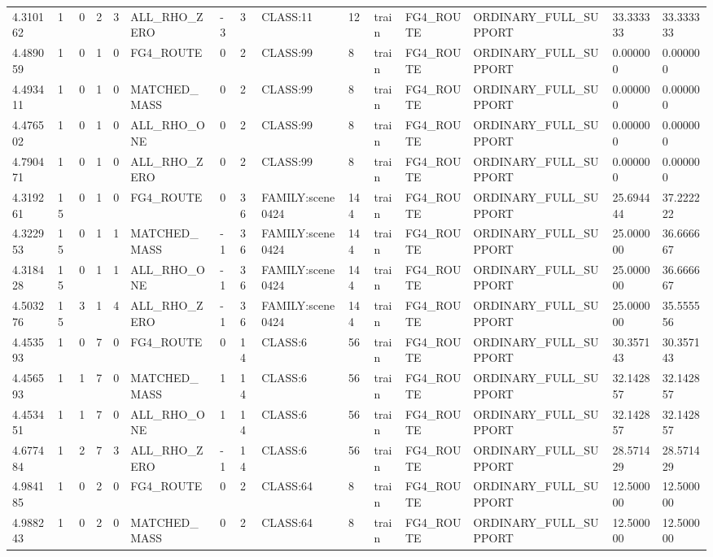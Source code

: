 \begin{tabular}{lllllllllllllll}
4.310162 & 1 & 0 & 2 & 3 & ALL\_RHO\_ZERO & -3 & 3 & CLASS:11 & 12 & train & FG4\_ROUTE & ORDINARY\_FULL\_SUPPORT & 33.333333 & 33.333333 \\
4.489059 & 1 & 0 & 1 & 0 & FG4\_ROUTE & 0 & 2 & CLASS:99 & 8 & train & FG4\_ROUTE & ORDINARY\_FULL\_SUPPORT & 0.000000 & 0.000000 \\
4.493411 & 1 & 0 & 1 & 0 & MATCHED\_MASS & 0 & 2 & CLASS:99 & 8 & train & FG4\_ROUTE & ORDINARY\_FULL\_SUPPORT & 0.000000 & 0.000000 \\
4.476502 & 1 & 0 & 1 & 0 & ALL\_RHO\_ONE & 0 & 2 & CLASS:99 & 8 & train & FG4\_ROUTE & ORDINARY\_FULL\_SUPPORT & 0.000000 & 0.000000 \\
4.790471 & 1 & 0 & 1 & 0 & ALL\_RHO\_ZERO & 0 & 2 & CLASS:99 & 8 & train & FG4\_ROUTE & ORDINARY\_FULL\_SUPPORT & 0.000000 & 0.000000 \\
4.319261 & 15 & 0 & 1 & 0 & FG4\_ROUTE & 0 & 36 & FAMILY:scene0424 & 144 & train & FG4\_ROUTE & ORDINARY\_FULL\_SUPPORT & 25.694444 & 37.222222 \\
4.322953 & 15 & 0 & 1 & 1 & MATCHED\_MASS & -1 & 36 & FAMILY:scene0424 & 144 & train & FG4\_ROUTE & ORDINARY\_FULL\_SUPPORT & 25.000000 & 36.666667 \\
4.318428 & 15 & 0 & 1 & 1 & ALL\_RHO\_ONE & -1 & 36 & FAMILY:scene0424 & 144 & train & FG4\_ROUTE & ORDINARY\_FULL\_SUPPORT & 25.000000 & 36.666667 \\
4.503276 & 15 & 3 & 1 & 4 & ALL\_RHO\_ZERO & -1 & 36 & FAMILY:scene0424 & 144 & train & FG4\_ROUTE & ORDINARY\_FULL\_SUPPORT & 25.000000 & 35.555556 \\
4.453593 & 1 & 0 & 7 & 0 & FG4\_ROUTE & 0 & 14 & CLASS:6 & 56 & train & FG4\_ROUTE & ORDINARY\_FULL\_SUPPORT & 30.357143 & 30.357143 \\
4.456593 & 1 & 1 & 7 & 0 & MATCHED\_MASS & 1 & 14 & CLASS:6 & 56 & train & FG4\_ROUTE & ORDINARY\_FULL\_SUPPORT & 32.142857 & 32.142857 \\
4.453451 & 1 & 1 & 7 & 0 & ALL\_RHO\_ONE & 1 & 14 & CLASS:6 & 56 & train & FG4\_ROUTE & ORDINARY\_FULL\_SUPPORT & 32.142857 & 32.142857 \\
4.677484 & 1 & 2 & 7 & 3 & ALL\_RHO\_ZERO & -1 & 14 & CLASS:6 & 56 & train & FG4\_ROUTE & ORDINARY\_FULL\_SUPPORT & 28.571429 & 28.571429 \\
4.984185 & 1 & 0 & 2 & 0 & FG4\_ROUTE & 0 & 2 & CLASS:64 & 8 & train & FG4\_ROUTE & ORDINARY\_FULL\_SUPPORT & 12.500000 & 12.500000 \\
4.988243 & 1 & 0 & 2 & 0 & MATCHED\_MASS & 0 & 2 & CLASS:64 & 8 & train & FG4\_ROUTE & ORDINARY\_FULL\_SUPPORT & 12.500000 & 12.500000 \\

\end{tabular}
